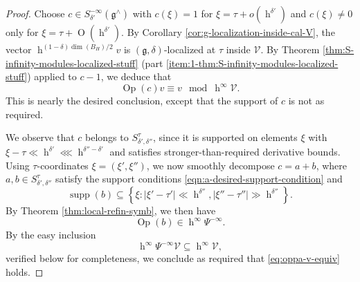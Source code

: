 \documentclass[reqno]{amsart}
\DeclareMathOperator{\h}{h}
\def\O{\operatorname{O}}
\DeclareMathOperator{\Opp}{Op}
\DeclareMathOperator{\supp}{supp}
\theoremstyle{plain} \newtheorem{theorem} {Theorem}
\theoremstyle{definition} \newtheorem{definition} [theorem] {Definition}
\theoremstyle{itplain} %
\numberwithin{equation}{section}
\numberwithin{theorem}{section}
\begin{document}
\begin{proof}
  Choose $c \in S^{-\infty}_{\delta '}(\mathfrak{g}^\wedge)$ with $c(\xi) = 1$ for $\xi = \tau + o(\h^{\delta'})$ and $c(\xi) \neq 0$ only for $\xi = \tau + \O(\h^{\delta'})$.  By Corollary \ref{cor:g-localization-inside-cal-V}, the vector $\h^{(1 - \delta) \dim(B_H)/2} v$ is $(\mathfrak{g},\delta)$-localized at $\tau$ inside $\mathcal{V}$.  By Theorem \ref{thm:S-infinity-modules-localized-stuff} (part \eqref{item:1-thm:S-infinity-modules-localized-stuff}) applied to $c-1$, we deduce that
  \begin{equation*}
    \Opp(c) v \equiv v \mod{\h^\infty \mathcal{V}}.
  \end{equation*}
  This is nearly the desired conclusion, except that the support of $c$ is not as required.

  We observe that $c$ belongs to $S^{\tau}_{\delta ', \delta ''}$, since it is supported on elements $\xi$ with $\xi - \tau \ll \h^{\delta '} \lll \h^{\delta '' - \delta '}$ and satisfies stronger-than-required derivative bounds.  Using $\tau$-coordinates $\xi = (\xi ', \xi '')$, we now smoothly decompose $c = a + b$, where $a,b \in S^{\tau}_{\delta ', \delta ''}$ satisfy the support conditions \eqref{eqn:a-desired-support-condition} and
  \[
    \supp(b) \subseteq \left\{\xi : |\xi ' - \tau '| \ll \h^{\delta ''}, |\xi '' - \tau ''| \gg \h^{ \delta ''} \right\}.
  \]
  By Theorem \ref{thm:local-refin-symb}, we then have
  \begin{equation*}
    \Opp(b) \in \h^\infty \Psi^{-\infty}.
  \end{equation*}
  By the easy inclusion
  \begin{equation}\label{eq:hinfty-psi-infty}
    \h^\infty \Psi^{-\infty} \mathcal{V} \subseteq \h^\infty \mathcal{V},
  \end{equation}
  verified below for completeness, we conclude as required that \eqref{eq:oppa-v-equiv} holds.
\end{proof}
\end{document}

